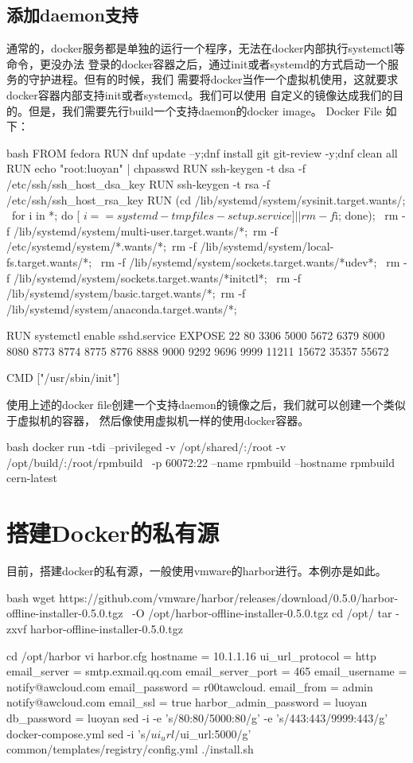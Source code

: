 \subsection{添加daemon支持}
通常的，docker服务都是单独的运行一个程序，无法在docker内部执行systemctl等命令，更没办法
登录的docker容器之后，通过init或者systemd的方式启动一个服务的守护进程。但有的时候，我们
需要将docker当作一个虚拟机使用，这就要求docker容器内部支持init或者systemcd。我们可以使用
自定义的镜像达成我们的目的。但是，我们需要先行build一个支持daemon的docker image。
Docker File 如下：
\begin{code-block}{bash}
FROM fedora
RUN dnf update --y;dnf install git git-review -y;dnf clean all
RUN echo "root:luoyan" | chpasswd
RUN ssh-keygen -t dsa -f /etc/ssh/ssh_host_dsa_key
RUN ssh-keygen -t rsa -f /etc/ssh/ssh_host_rsa_key
RUN (cd /lib/systemd/system/sysinit.target.wants/; \
for i in *; do [ $i == systemd-tmpfiles-setup.service ] || rm -f $i; done); \
rm -f /lib/systemd/system/multi-user.target.wants/*;\
rm -f /etc/systemd/system/*.wants/*;\
rm -f /lib/systemd/system/local-fs.target.wants/*; \
rm -f /lib/systemd/system/sockets.target.wants/*udev*; \
rm -f /lib/systemd/system/sockets.target.wants/*initctl*; \
rm -f /lib/systemd/system/basic.target.wants/*;\
rm -f /lib/systemd/system/anaconda.target.wants/*;

RUN systemctl enable sshd.service
EXPOSE 22 80 3306 5000 5672 6379 8000 8080 8773 8774 8775 8776 8888 9000 9292 9696 9999 11211 15672 35357 55672

CMD ["/usr/sbin/init"]
\end{code-block}

使用上述的docker file创建一个支持daemon的镜像之后，我们就可以创建一个类似于虚拟机的容器，
然后像使用虚拟机一样的使用docker容器。
\begin{code-block}{bash}
docker run -tdi --privileged -v /opt/shared/:/root -v /opt/build/:/root/rpmbuild \
    -p 60072:22 --name rpmbuild --hostname rpmbuild cern-latest
\end{code-block}

\section{搭建Docker的私有源}
目前，搭建docker的私有源，一般使用vmware的harbor进行。本例亦是如此。
\begin{code-block}{bash}
wget https://github.com/vmware/harbor/releases/download/0.5.0/harbor-offline-installer-0.5.0.tgz \
    -O /opt/harbor-offline-installer-0.5.0.tgz
cd /opt/
tar -zxvf harbor-offline-installer-0.5.0.tgz

cd /opt/harbor
vi harbor.cfg
hostname = 10.1.1.16
ui_url_protocol = http
email_server = smtp.exmail.qq.com
email_server_port = 465
email_username = notify@awcloud.com
email_password = r00tawcloud.
email_from = admin notify@awcloud.com
email_ssl = true
harbor_admin_password = luoyan
db_password = luoyan
sed -i -e 's/80:80/5000:80/g' -e 's/443:443/9999:443/g' docker-compose.yml
sed -i 's/$ui_url/$ui_url:5000/g' common/templates/registry/config.yml
./install.sh
\end{code-block}

